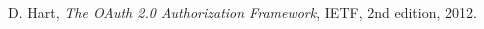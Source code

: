 \begin{thebibliography}{9}

  D. Hart,
  \emph{The OAuth 2.0 Authorization Framework},
  IETF,
  2nd edition,
  2012.

\end{thebibliography}